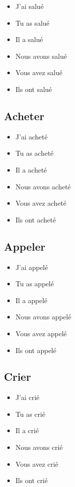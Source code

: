 \begin{itemize}
    \item J'ai salué 
    \item Tu as salué 
    \item Il a salué 
    \item Nous avons salué 
    \item Vous avez salué 
    \item Ils ont salué
\end{itemize}

\subsection{Acheter}

\begin{itemize}
    \item J'ai acheté 
    \item Tu as acheté 
    \item Il a acheté
    \item Nous avons acheté 
    \item Vous avez acheté 
    \item Ils ont acheté
\end{itemize}

\subsection{Appeler}

\begin{itemize}
    \item J'ai appelé 
    \item Tu as appelé 
    \item Il a appelé 
    \item Nous avons appelé 
    \item Vous avez appelé 
    \item Ils ont appelé
\end{itemize}

\subsection{Crier}

\begin{itemize}
    \item J'ai crié 
    \item Tu as crié 
    \item Il a crié 
    \item Nous avons crié 
    \item Vous avez crié 
    \item Ils ont crié
\end{itemize}

